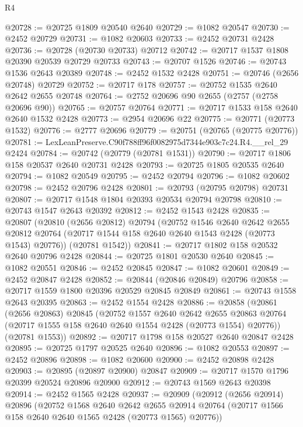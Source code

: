 \begin{lexlean}{R4}
\begin{coremodule}
@20728 := @20725 @1809 @20540 @2640
@20729 := @1082 @20547
@20730 := @2452 @20729
@20731 := @1082 @20603
@20733 := @2452 @20731 @2428
@20736 := @20728 (@20730 @20733) @20712
@20742 := @20717 @1537 @1808 @20390 @20539 @20729 @20733
@20743 := @20707 @1526
@20746 := @20743 @1536 @2643 @20389
@20748 := @2452 @1532 @2428
@20751 := @20746 (@2656 @20748) @20729
@20752 := @20717 @178
@20757 := @20752 @1535 @2640 @2642 @2655 @20748
@20764 := @2752 @20696 @90 @2655 (@2757 (@2758 @20696 @90))
@20765 := @20757 @20764
@20771 := @20717 @1533 @158 @2640 @2640 @1532 @2428
@20773 := @2954 @20696 @22
@20775 := @20771 (@20773 @1532)
@20776 := @2777 @20696
@20779 := @20751 (@20765 (@20775 @20776))
@20781 := LexLeanPreserve.C90f788ff96f0082975d7344e903c7c24.R4.__rel_29 @2424
@20784 := @20742 (@20779 (@20781 @1531))
@20790 := @20717 @1806 @158 @20537 @2640 @20731 @2428
@20793 := @20725 @1805 @20535 @2640
@20794 := @1082 @20549
@20795 := @2452 @20794
@20796 := @1082 @20602
@20798 := @2452 @20796 @2428
@20801 := @20793 (@20795 @20798) @20731
@20807 := @20717 @1548 @1804 @20393 @20534 @20794 @20798
@20810 := @20743 @1547 @2643 @20392
@20812 := @2452 @1543 @2428
@20835 := @20807
    (@20810
      (@2656 @20812)
      @20794
      (@20752
        @1546
        @2640
        @2642
        @2655
        @20812
        @20764
        (@20717 @1544 @158 @2640 @2640 @1543 @2428 (@20773 @1543) @20776))
      (@20781 @1542))
@20841 := @20717 @1802 @158 @20532 @2640 @20796 @2428
@20844 := @20725 @1801 @20530 @2640
@20845 := @1082 @20551
@20846 := @2452 @20845
@20847 := @1082 @20601
@20849 := @2452 @20847 @2428
@20852 := @20844 (@20846 @20849) @20796
@20858 := @20717 @1559 @1800 @20396 @20529 @20845 @20849
@20861 := @20743 @1558 @2643 @20395
@20863 := @2452 @1554 @2428
@20886 := @20858
    (@20861
      (@2656 @20863)
      @20845
      (@20752
        @1557
        @2640
        @2642
        @2655
        @20863
        @20764
        (@20717 @1555 @158 @2640 @2640 @1554 @2428 (@20773 @1554) @20776))
      (@20781 @1553))
@20892 := @20717 @1798 @158 @20527 @2640 @20847 @2428
@20895 := @20725 @1797 @20525 @2640
@20896 := @1082 @20553
@20897 := @2452 @20896
@20898 := @1082 @20600
@20900 := @2452 @20898 @2428
@20903 := @20895 (@20897 @20900) @20847
@20909 := @20717 @1570 @1796 @20399 @20524 @20896 @20900
@20912 := @20743 @1569 @2643 @20398
@20914 := @2452 @1565 @2428
@20937 := @20909
    (@20912
      (@2656 @20914)
      @20896
      (@20752
        @1568
        @2640
        @2642
        @2655
        @20914
        @20764
        (@20717 @1566 @158 @2640 @2640 @1565 @2428 (@20773 @1565) @20776))

\end{coremodule}
\end{lexlean}
